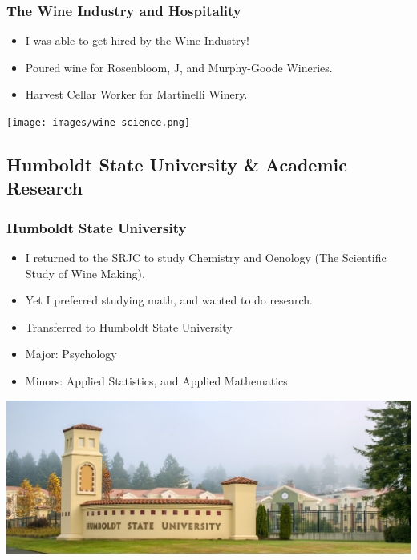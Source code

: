 \documentclass{beamer}
\begin{document}
\begin{frame}
	\frametitle{The Wine Industry and Hospitality}
	\begin{itemize}
	\item I was able to get hired by the Wine Industry!
	\item Poured wine for Rosenbloom, J, and Murphy-Goode Wineries.
	\item Harvest Cellar Worker for Martinelli Winery.
\end{itemize}
\begin{center}
	\texttt{[image: images/wine science.png]}
\end{center}
\end{frame}

		\subsection{Humboldt State University \& Academic Research}
		\begin{frame}
		\frametitle{Humboldt State University}
	\begin{itemize}
		\item I returned to the SRJC to study Chemistry and Oenology (The Scientific Study of Wine Making).
\item Yet I preferred studying math, and wanted to do research.
\item Transferred to Humboldt State University
\item Major:   Psychology
\item Minors:  Applied Statistics, and Applied Mathematics
\end{itemize}
\begin{center}
	\includegraphics[width = 1.0\textwidth]{images/HSU.PNG}
\end{center}
\end{frame}
\end{document}
